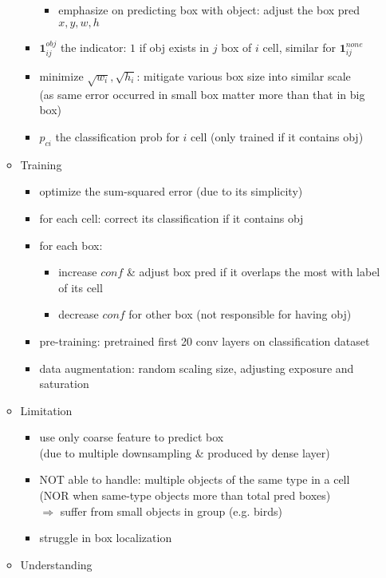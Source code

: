 \begin{itemize}
\begin{itemize}
\begin{itemize}
\begin{itemize}
			\item emphasize on predicting box with object: adjust the box pred $x,y,w,h$
			\end{itemize}
		\item $\mathbf{1}^{obj}_{ij}$ the indicator: $1$ if obj exists in $j$ box of $i$ cell, similar for $\mathbf 1^{none}_{ij}$
		\item minimize $\sqrt{w_i}, \sqrt{h_i}$: mitigate various box size into similar scale \\ 
		(as same error occurred in small box matter more than that in big box)
		\item $p_{ci}$ the classification prob for $i$ cell (only trained if it contains obj)
		\end{itemize}
	\item Training
		\begin{itemize}
		\item optimize the sum-squared error (due to its simplicity)
		\item for each cell: correct its classification if it contains obj
		\item for each box:
			\begin{itemize}
			\item increase $conf$ \& adjust box pred if it overlaps the most with label of its cell
			\item decrease $conf$ for other box (not responsible for having obj)
			\end{itemize}
		\item pre-training: pretrained first 20 conv layers on classification dataset
		\item data augmentation: random scaling size, adjusting exposure and saturation
		\end{itemize}
	\item Limitation
		\begin{itemize}
		\item use only coarse feature to predict box \\ 
		(due to multiple downsampling \& produced by dense layer)
		\item NOT able to handle: multiple objects of the same type in a cell \\
		(NOR when same-type objects more than total pred boxes) \\
		$\Rightarrow$ suffer from small objects in group (e.g. birds)
		\item struggle in box localization
		\end{itemize}
	\item Understanding

\end{itemize}
\end{itemize}
